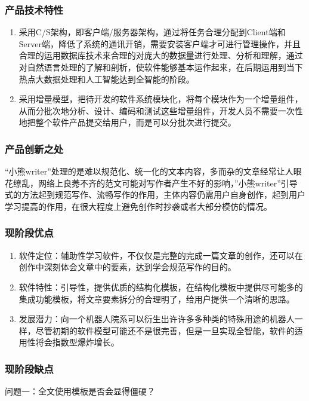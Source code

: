 \documentclass[10pt,letterpaper]{article}
\begin{document}
\subsubsection{产品技术特性}
\begin{enumerate}
\item 	采用C/S架构，即客户端/服务器架构，通过将任务合理分配到Client端和Server端，降低了系统的通讯开销，需要安装客户端才可进行管理操作，并且合理的运用数据库技术来合理的对庞大的数据量进行处理、分析和理解，通过对自然语言处理的了解和剖析，使软件能够基本运作起来，在后期运用到当下热点大数据处理和人工智能达到全智能的阶段。
\item 	采用增量模型，把待开发的软件系统模块化，将每个模块作为一个增量组件，从而分批次地分析、设计、编码和测试这些增量组件，开发人员不需要一次性地把整个软件产品提交给用户，而是可以分批次进行提交。
\end{enumerate}

\subsubsection{产品创新之处}
“小熊writer”处理的是难以规范化、统一化的文本内容，多而杂的文章经常让人眼花缭乱，网络上良莠不齐的范文可能对写作者产生不好的影响，”小熊writer”引导式的方法起到规范写作、流畅写作的作用，主体内容仍需用户自身创作，起到用户学习提高的作用，在很大程度上避免创作时抄袭或者大部分模仿的情况。

\subsubsection{现阶段优点}
\begin{enumerate}
\item 	软件定位：辅助性学习软件，不仅仅是完整的完成一篇文章的创作，还可以在创作中深刻体会文章中的要素，达到学会规范写作的目的。
\item 	软件特性：引导性，提供优质的结构化模板，在结构化模板中提供尽可能多的集成功能模板，将文章要素拆分的合理明了，给用户提供一个清晰的思路。
\item 	发展潜力：向一个机器人院系可以衍生出许许多多种类的特殊用途的机器人一样，尽管初期的软件模型可能还不是很完善，但是一旦实现全智能，软件的适用性将会指数型爆炸增长。
\end{enumerate}

\subsubsection{现阶段缺点}

问题一：全文使用模板是否会显得僵硬？
\end{document}
